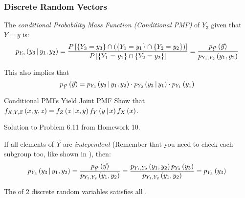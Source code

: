 \subsubsection{Discrete Random Vectors}\label{subsubsec:Conditional Probability Discrete Random Vectors}
\begin{definition}\label{def:Discrete Random Vector-Conditional PMF}
  The \emph{conditional Probability Mass Function (Conditional PMF)} of $Y_{3}$ given that $Y=y$ is:
  \begin{equation}\label{eq:Discrete Random Vector-Conditional PMF}
    p_{Y_{3}} \left( y_{3} \operatorname{\vert} y_{1},y_{2} \right)
    = \frac{P \left[ \lbrace Y_{3}=y_{3} \rbrace \cap \left( \lbrace Y_{1}=y_{1} \rbrace \cap \lbrace Y_{2}=y_{2} \rbrace \right) \right]}{P \left[ \lbrace Y_{1}=y_{1} \rbrace \cap \lbrace Y_{2}=y_{2} \rbrace \right]}
    = \frac{p_{\vec{Y}} \left( \vec{y} \right)}{p_{Y_{1},Y_{2}} \left( y_{1},y_{2} \right)}
  \end{equation}
  \begin{remark}
    This also implies that
    \begin{equation}\label{eq:Discrete Random Vector-Joint PMF}
      p_{\vec{Y}} \left( \vec{y} \right) = p_{Y_{3}} \left( y_{3} \operatorname{\vert} y_{1},y_{2} \right) \cdot p_{Y_{2}} \left( y_{2} \operatorname{\vert} y_{1} \right) \cdot p_{Y_{1}} \left( y_{1} \right)
    \end{equation}
  \end{remark}
  \begin{example}[Problem 6.11]{Conditional PMFs Yield Joint PMF}
    Show that $f_{X,Y,Z} \left( x,y,z \right) = f_{Z} \left( z \operatorname{\vert} x,y \right) f_{Y} \left( y \operatorname{\vert} x \right) f_{X} \left( x \right)$.

    \tcblower

    Solution to Problem 6.11 from Homework 10.
  \end{example}
  \begin{remark}
    If all elements of $\vec{Y}$ are \emph{independent} (Remember that you need to check each subgroup too, like shown in ), then:
    \begin{equation}\label{eq:Discrete Random Vector-Independent Conditional PMF}
      p_{Y_{3}} \left( y_{3} \operatorname{\vert} y_{1},y_{2} \right)
      = \frac{p_{\vec{Y}} \left( \vec{y} \right)}{p_{Y_{1},Y_{2}} \left( y_{1},y_{2} \right)}
      = \frac{p_{Y_{1},Y_{2}} \left( y_{1},y_{2} \right) p_{Y_{3}} \left( y_{3} \right)}{p_{Y_{1},Y_{2}} \left( y_{1},y_{2} \right)}
      = p_{Y_{3}} \left( y_{3} \right)
    \end{equation}
  \end{remark}
  \begin{remark}
    The  of 2 discrete random variables satisfies all .
  \end{remark}
\end{definition}

